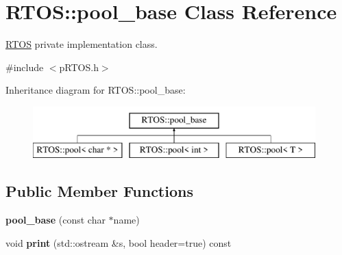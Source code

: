\hypertarget{class_r_t_o_s_1_1pool__base}{}\section{R\+T\+OS\+:\+:pool\+\_\+base Class Reference}
\label{class_r_t_o_s_1_1pool__base}


\hyperlink{class_r_t_o_s}{R\+T\+OS} private implementation class.  




{\ttfamily \#include $<$p\+R\+T\+O\+S.\+h$>$}

Inheritance diagram for R\+T\+OS\+:\+:pool\+\_\+base\+:\begin{figure}[H]
\begin{center}
\leavevmode
\includegraphics[height=2.000000cm]{class_r_t_o_s_1_1pool__base}
\end{center}
\end{figure}
\subsection*{Public Member Functions}
\begin{DoxyCompactItemize}
\item 
{\bfseries pool\+\_\+base} (const char $\ast$name)\hypertarget{class_r_t_o_s_1_1pool__base_a7ce39242e76cd0c2f1601155cb43f309}{}\label{class_r_t_o_s_1_1pool__base_a7ce39242e76cd0c2f1601155cb43f309}

\item 
void {\bfseries print} (std\+::ostream \&s, bool header=true) const \hypertarget{class_r_t_o_s_1_1pool__base_a15b26e0b643798c8cc478398c054fd7e}{}\label{class_r_t_o_s_1_1pool__base_a15b26e0b643798c8cc478398c054fd7e}

\end{DoxyCompactItemize}
